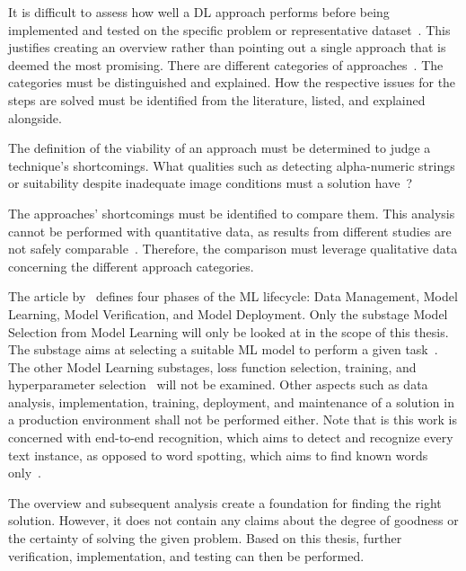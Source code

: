 It is difficult to assess how well a \ac{DL} approach performs before being implemented and tested
on the specific problem or representative dataset~\citep{arpteg_software_2018}.
This justifies creating an overview rather than pointing out a single approach that is
deemed the most promising.
There are different categories of approaches~\citep{chen_text_2021,long_scene_2021}.
The categories must be distinguished and explained.
How the respective issues for the steps are solved must be
identified from the literature, listed, and explained alongside.

The definition of the viability of an approach must be determined to judge a technique's shortcomings.
What qualities such as detecting alpha-numeric strings or suitability despite
inadequate image conditions must a solution have~\citep{ghosh_visual_2017, hu_gtc_2020}?

The approaches' shortcomings must be identified to compare them.
This analysis cannot be performed with quantitative data, as results from different studies are
not safely comparable~\citep{baek_what_2019,arpteg_software_2018,long_scene_2021}.
Therefore, the comparison must leverage qualitative data concerning the different approach
categories.

The article by~\cite{ashmore_assuring_2021} defines four phases of the \ac{ML} lifecycle:
Data Management, Model Learning, Model Verification, and Model Deployment.
Only the substage Model Selection from Model Learning will only be looked at in the scope of this
thesis.
The substage aims at selecting a suitable \ac{ML} model to perform a given
task~\citep{ashmore_assuring_2021}.
The other Model Learning substages, loss function selection, training, and hyperparameter
selection~\citep{ashmore_assuring_2021} will not be examined.
Other aspects such as data analysis, implementation, training, deployment, and maintenance of a
solution in a production environment shall not be performed either.
Note that is this work is concerned with end-to-end recognition, which aims to detect and recognize
every text instance, as opposed to word spotting, which aims to find known
words only~\citep{chen_text_2021,karatzas_icdar_2015}.

The overview and subsequent analysis create a foundation for finding the right solution.
However, it does not contain any claims about the degree of goodness or the certainty of
solving the given problem.
Based on this thesis, further verification, implementation, and testing can then be performed.

